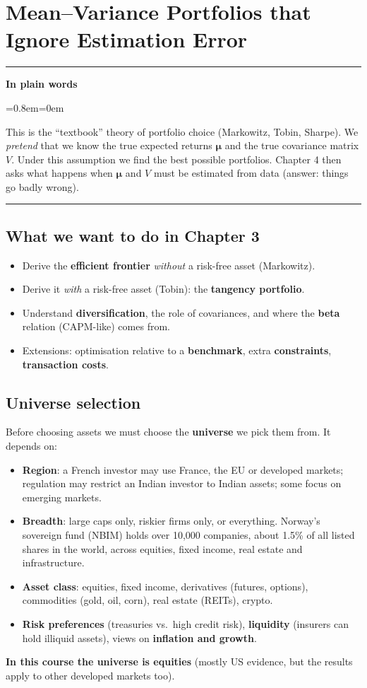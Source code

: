 \documentclass[11pt,a4paper]{report}
\newenvironment{notebox}[1]
  {\par\medskip\Needspace{6\baselineskip}\noindent\rule{\linewidth}{0.4pt}\par\nopagebreak
   \noindent\textbf{#1}\par\nopagebreak
   \begin{list}{}{\leftmargin=0.8em\rightmargin=0em\topsep=2pt}\item[]}
  {\end{list}\nopagebreak\noindent\rule{\linewidth}{0.4pt}\par\medskip}
\newenvironment{plainbox}{\begin{notebox}{In plain words}}{\end{notebox}}
\newcommand{\mub}{\bm{\mu}}
\begin{document}
\chapter{Mean--Variance Portfolios that Ignore Estimation Error}
\label{ch:3}

\begin{plainbox}
This is the ``textbook'' theory of portfolio choice (Markowitz, Tobin, Sharpe).
We \emph{pretend} that we know the true expected returns $\mub$ and the true
covariance matrix $V$. Under this assumption we find the best possible
portfolios. Chapter 4 then asks what happens when $\mub$ and $V$ must be
estimated from data (answer: things go badly wrong).
\end{plainbox}

\section{What we want to do in Chapter 3}
\begin{itemize}
  \item Derive the \textbf{efficient frontier} \emph{without} a risk-free asset (Markowitz).
  \item Derive it \emph{with} a risk-free asset (Tobin): the \textbf{tangency portfolio}.
  \item Understand \textbf{diversification}, the role of covariances, and where the
    \textbf{beta} relation (CAPM-like) comes from.
  \item Extensions: optimisation relative to a \textbf{benchmark}, extra
    \textbf{constraints}, \textbf{transaction costs}.
\end{itemize}

\section{Universe selection}
Before choosing assets we must choose the \textbf{universe} we pick them from.
It depends on:
\begin{itemize}
  \item \textbf{Region}: a French investor may use France, the EU or developed
    markets; regulation may restrict an Indian investor to Indian assets; some
    focus on emerging markets.
  \item \textbf{Breadth}: large caps only, riskier firms only, or everything.
    Norway's sovereign fund (NBIM) holds over 10{,}000 companies, about 1.5\% of
    all listed shares in the world, across equities, fixed income, real estate
    and infrastructure.
  \item \textbf{Asset class}: equities, fixed income, derivatives (futures,
    options), commodities (gold, oil, corn), real estate (REITs), crypto.
  \item \textbf{Risk preferences} (treasuries vs.\ high credit risk),
    \textbf{liquidity} (insurers can hold illiquid assets), views on
    \textbf{inflation and growth}.
\end{itemize}
\textbf{In this course the universe is equities} (mostly US evidence, but the
results apply to other developed markets too).
\end{document}
